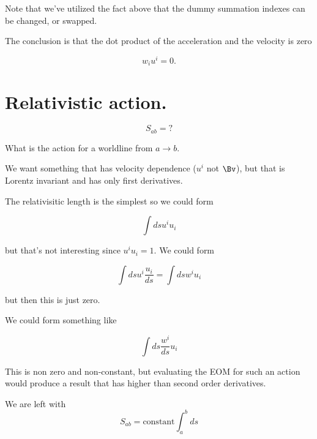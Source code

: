 Note that we've utilized the fact above that the dummy summation indexes can be changed, or swapped.

The conclusion is that the dot product of the acceleration and the velocity is zero

\begin{equation}\label{eqn:relativisticElectrodynamicsL7:130}
w_i u^i = 0.
\end{equation}

\section{Relativistic action.}

\begin{equation}\label{eqn:relativisticElectrodynamicsL7:140}
S_{ab} = ?
\end{equation}

What is the action for a worldline from $a \rightarrow b$.

We want something that has velocity dependence ($u^i$ not $\Bv$), but that is Lorentz invariant and has only first derivatives.

The relativisitic length is the simplest so we could form

\begin{equation}\label{eqn:relativisticElectrodynamicsL7:150}
\int ds u^i u_i
\end{equation}

but that's not interesting since $u^i u_i = 1$.  We could form

\begin{equation}\label{eqn:relativisticElectrodynamicsL7:160}
\int ds u^i \frac{u_i}{ds} = \int ds w^i u_i
\end{equation}

but then this is just zero.

We could form something like

\begin{equation}\label{eqn:relativisticElectrodynamicsL7:170}
\int ds \frac{w^i}{ds} u_i
\end{equation}

This is non zero and non-constant, but evaluating the EOM for such an action would produce a result that has higher than second order derivatives.

We are left with
\begin{equation}\label{eqn:relativisticElectrodynamicsL7:180}
S_{ab} = \text{constant} \int_a^b ds 
\end{equation}

